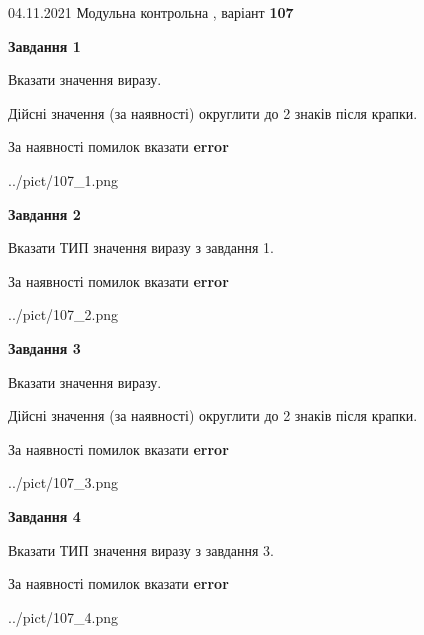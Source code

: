 \documentclass[11pt, ukrainian]{article}
\begin{document}
{04.11.2021 Модульна контрольна , варіант  \No \textbf { 107 }\par}
{
\begin {large}
{\begin {center}\textbf{Завдання 1}\end {center}}\par
Вказати значення виразу. \par
Дійсні значення (за наявності) округлити до 2 знаків після крапки. \par
За наявності помилок вказати \textbf{error}

\begin{center}
	{../pict/107_1.png}
\end{center}
\newpage

{\begin {center}\textbf{Завдання 2}\end {center}}\par
Вказати ТИП значення виразу з завдання 1. \par
За наявності помилок вказати \textbf{error}

\begin{center}
	{../pict/107_2.png}
\end{center}
\newpage

{\begin {center}\textbf{Завдання 3}\end {center}}\par
Вказати значення виразу. \par
Дійсні значення (за наявності) округлити до 2 знаків після крапки. \par
За наявності помилок вказати \textbf{error}

\begin{center}
	{../pict/107_3.png}
\end{center}
\newpage

{\begin {center}\textbf{Завдання 4}\end {center}}\par
Вказати ТИП значення виразу з завдання 3. \par
За наявності помилок вказати \textbf{error}

\begin{center}
	{../pict/107_4.png}
\end{center}
\newpage


\end{large}}
\end{document}
